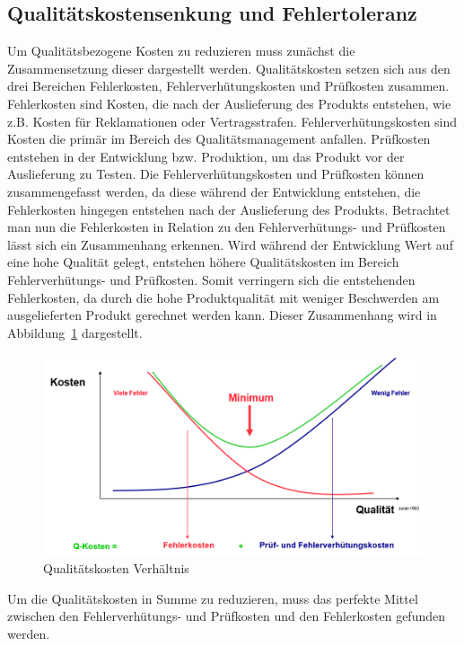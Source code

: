\subsection{Qualitätskostensenkung und Fehlertoleranz}
Um Qualitätsbezogene Kosten zu reduzieren muss zunächst die Zusammensetzung dieser dargestellt werden.
Qualitätskosten setzen sich aus den drei Bereichen Fehlerkosten, Fehlerverhütungskosten und Prüfkosten zusammen.
Fehlerkosten sind Kosten, die nach der Auslieferung des Produkts entstehen, wie z.B. Kosten für Reklamationen oder Vertragsstrafen.
Fehlerverhütungskosten sind Kosten die primär im Bereich des Qualitätsmanagement anfallen.
Prüfkosten entstehen in der Entwicklung bzw. Produktion, um das Produkt vor der Auslieferung zu Testen.
Die Fehlerverhütungskosten und Prüfkosten können zusammengefasst werden, da diese während der Entwicklung entstehen, die Fehlerkosten hingegen entstehen nach der Auslieferung des Produkts.
\newparagraph
Betrachtet man nun die Fehlerkosten in Relation zu den Fehlerverhütungs- und Prüfkosten lässt sich ein Zusammenhang erkennen.
Wird während der Entwicklung Wert auf eine hohe Qualität gelegt, entstehen höhere Qualitätskosten im Bereich Fehlerverhütungs- und Prüfkosten. 
Somit verringern sich die entstehenden Fehlerkosten, da durch die hohe Produktqualität mit weniger Beschwerden am ausgelieferten Produkt gerechnet werden kann.
Dieser Zusammenhang wird in Abbildung~\ref{fig:QKostenVerhaeltnis} dargestellt.
\begin{figure}[H]
    \centering
    \includegraphics[width=1\textwidth]{images/qkostenverhaeltnis.png}
    \caption{Qualitätskosten Verhältnis}
    \label{fig:QKostenVerhaeltnis}
\end{figure}\noindent
Um die Qualitätskosten in Summe zu reduzieren, muss das perfekte Mittel zwischen den Fehlerverhütungs- und Prüfkosten und den Fehlerkosten gefunden werden.
